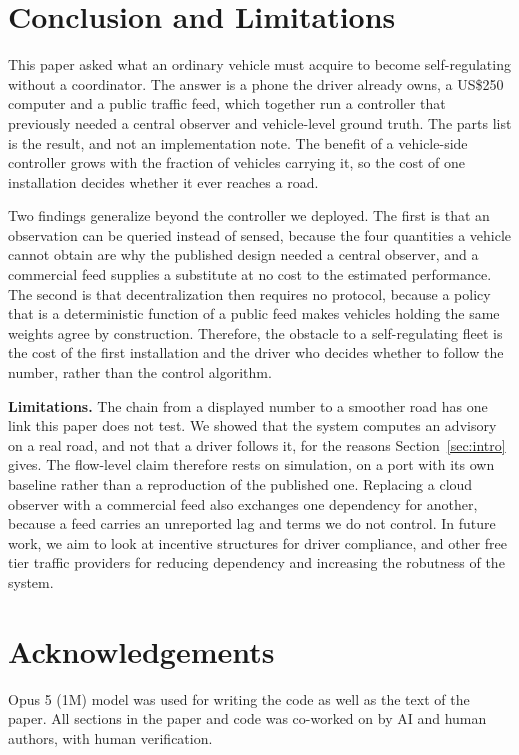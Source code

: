 \section{Conclusion and Limitations}

This paper asked what an ordinary vehicle must acquire to become self-regulating without a coordinator. The answer is a phone the driver already owns, a US\$250 computer and a public traffic feed, which together run a controller that previously needed a central observer and vehicle-level ground truth. The parts list is the result, and not an implementation note. The benefit of a vehicle-side controller grows with the fraction of vehicles carrying it, so the cost of one installation decides whether it ever reaches a road.

Two findings generalize beyond the controller we deployed. The first is that an observation can be queried instead of sensed, because the four quantities a vehicle cannot obtain are why the published design needed a central observer, and a commercial feed supplies a substitute at no cost to the estimated performance. The second is that decentralization then requires no protocol, because a policy that is a deterministic function of a public feed makes vehicles holding the same weights agree by construction. Therefore, the obstacle to a self-regulating fleet is the cost of the first installation and the driver who decides whether to follow the number, rather than the control algorithm.

\noindent\textbf{Limitations.} The chain from a displayed number to a smoother road has one link this paper does not test. We showed that the system computes an advisory on a real road, and not that a driver follows it, for the reasons Section~\ref{sec:intro} gives. The flow-level claim therefore rests on simulation, on a port with its own baseline rather than a reproduction of the published one. Replacing a cloud observer with a commercial feed also exchanges one dependency for another, because a feed carries an unreported lag and terms we do not control. In future work, we aim to look at incentive structures for driver compliance, and other free tier traffic providers for reducing dependency and increasing the robutness of the system.

\section{Acknowledgements}
Opus 5 (1M) model was used for writing the code as well as the text of the paper. All sections in the paper and code was co-worked on by AI and human authors, with human verification.